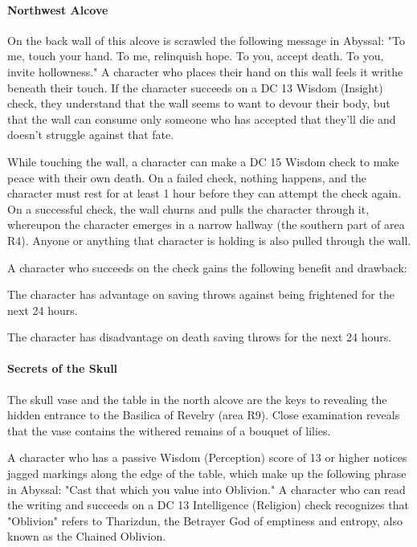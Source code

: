 \documentclass[10pt,a4paper,twoside,bg=print,twocolumn,openany,nodeprecatedcode]{dndbook}
\begin{document}
\paragraph{Northwest Alcove}
On the back wall of this alcove is scrawled the following message in Abyssal: "To me, touch your hand. To me, relinquish hope. To you, accept death. To you, invite hollowness." A character who places their hand on this wall feels it writhe beneath their touch. If the character succeeds on a DC 13 Wisdom (Insight) check, they understand that the wall seems to want to devour their body, but that the wall can consume only someone who has accepted that they'll die and doesn't struggle against that fate.

While touching the wall, a character can make a DC 15 Wisdom check to make peace with their own death. On a failed check, nothing happens, and the character must rest for at least 1 hour before they can attempt the check again. On a successful check, the wall churns and pulls the character through it, whereupon the character emerges in a narrow hallway (the southern part of area R4). Anyone or anything that character is holding is also pulled through the wall.

A character who succeeds on the check gains the following benefit and drawback:

\begin{DndComment}{}
\begin{description}[nolistsep]
\item[Benefit.]
The character has advantage on saving throws against being frightened for the next 24 hours.
\item[Drawback.]
The character has disadvantage on death saving throws for the next 24 hours.
\end{description}
\end{DndComment}

\paragraph{Secrets of the Skull}
The skull vase and the table in the north alcove are the keys to revealing the hidden entrance to the Basilica of Revelry (area R9). Close examination reveals that the vase contains the withered remains of a bouquet of lilies.

A character who has a passive Wisdom (Perception) score of 13 or higher notices jagged markings along the edge of the table, which make up the following phrase in Abyssal: "Cast that which you value into Oblivion." A character who can read the writing and succeeds on a DC 13 Intelligence (Religion) check recognizes that "Oblivion" refers to Tharizdun, the Betrayer God of emptiness and entropy, also known as the Chained Oblivion.
\end{document}
